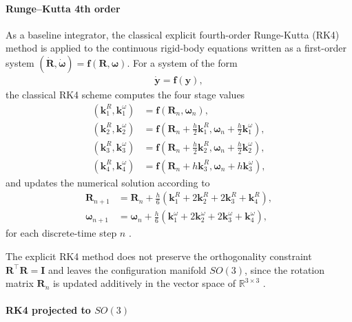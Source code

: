 \paragraph{Runge--Kutta 4th order}
As a baseline integrator, the classical explicit fourth-order Runge-Kutta (RK4) method is applied to the continuous rigid-body equations written as a first-order system $(\dot{\bm{R}},\dot{\bm{\omega}}) = \bm{f}(\bm{R},\bm{\omega})$. For a system of the form
\begin{align}
    \dot{\bm{y}} = \bm{f}(\bm{y}),
\end{align}
the classical RK4 scheme computes the four stage values
\begin{subequations}\label{eq:rk4_stages}
\begin{align}
    (\bm{k}_1^{R}, \bm{k}_1^{\omega}) &= \bm{f}(\bm{R}_n, \bm{\omega}_n), \\
    (\bm{k}_2^{R}, \bm{k}_2^{\omega}) &= \bm{f}\!\left(\bm{R}_n+\frac{h}{2}\bm{k}_1^{R},\bm{\omega}_n+\frac{h}{2}\bm{k}_1^{\omega}\right), \\
    (\bm{k}_3^{R}, \bm{k}_3^{\omega}) &= \bm{f}\!\left(\bm{R}_n+\frac{h}{2}\bm{k}_2^{R},\bm{\omega}_n+\frac{h}{2}\bm{k}_2^{\omega}\right), \\
   (\bm{k}_4^{R}, \bm{k}_4^{\omega}) &= \bm{f}\!\left(\bm{R}_n+h\bm{k}_3^{R}, \bm{\omega}_n+h\bm{k}_3^{\omega}\right),
\end{align}
\end{subequations}
and updates the numerical solution according to
\begin{subequations}\label{eq:rk4_update}
\begin{align}
    \bm{R}_{n+1}
    &=
    \bm{R}_n
    +
    \frac{h}{6}
    \left(
    \bm{k}_1^{R} + 2\bm{k}_2^{R} + 2\bm{k}_3^{R} + \bm{k}_4^{R}
    \right), \\
    \bm{\omega}_{n+1}
    &=
    \bm{\omega}_n
    +
    \frac{h}{6}
    \left(
    \bm{k}_1^{\omega} + 2\bm{k}_2^{\omega} + 2\bm{k}_3^{\omega} + \bm{k}_4^{\omega}
    \right),
\end{align}
\end{subequations}
for each discrete-time step $n$ \cite{butcher2016numerical}.

The explicit RK4 method does not preserve the orthogonality constraint \(\bm{R}^\top \bm{R}=\bm{I}\) and leaves the configuration manifold $SO(3)$, since the rotation matrix $\bm{R}_n$ is updated additively in the vector space of $\mathbb{R}^{3 \times 3}$ \cite{CELLEDONI2003421}.

\paragraph{RK4 projected to $SO(3)$}

